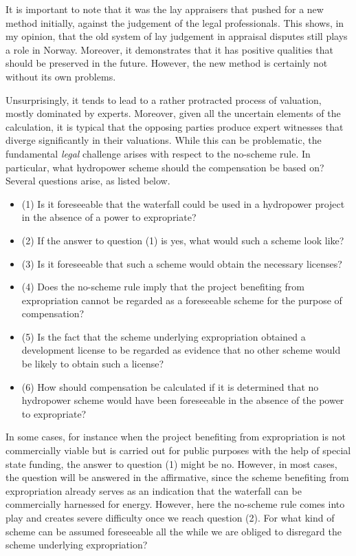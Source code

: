 It is important to note that it was the lay appraisers that pushed for a new method initially, against the judgement of the legal professionals. This shows, in my opinion, that the old system of lay judgement in appraisal disputes still plays a role in Norway. Moreover, it demonstrates that it has positive qualities that should be preserved in the future. However, the new method is certainly not without its own problems. 

Unsurprisingly, it tends to lead to a rather protracted process of valuation, mostly dominated by experts. Moreover, given all the uncertain elements of the calculation, it is typical that the opposing parties produce expert witnesses that diverge significantly in their valuations. While this can be problematic, the fundamental \emph{legal} challenge arises with respect to the no-scheme rule. In particular, what hydropower scheme should the compensation be based on? Several questions arise, as listed below.

\begin{itemize}
\item (1) Is it foreseeable that the waterfall could be used in a hydropower project in the absence of a power to expropriate?
\item (2) If the answer to question (1) is yes, what would such a scheme look like?
\item (3) Is it foreseeable that such a scheme would obtain the necessary licenses?
\item (4) Does the no-scheme rule imply that the project benefiting from expropriation cannot be regarded as a foreseeable scheme for the purpose of compensation?
\item (5) Is the fact that the scheme underlying expropriation obtained a development license to be regarded as evidence that no other scheme would be likely to obtain such a license?
\item (6) How should compensation be calculated if it is determined that no hydropower scheme would have been foreseeable in the absence of the power to expropriate? 
\end{itemize}

In some cases, for instance when the project benefiting from expropriation is not commercially viable but is carried out for public purposes with the help of special state funding, the answer to question (1) might be no. However, in most cases, the question will be answered in the affirmative, since the scheme benefiting from expropriation already serves as an indication that the waterfall can be commercially harnessed for energy. However, here the no-scheme rule comes into play and creates severe difficulty once we reach question (2). For what kind of scheme can be assumed foreseeable all the while we are obliged to disregard the scheme underlying expropriation? 

